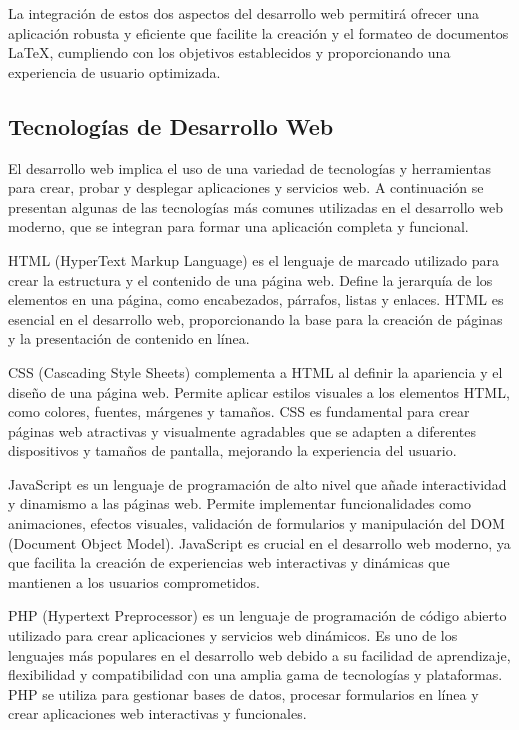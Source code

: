 La integración de estos dos aspectos del desarrollo web permitirá ofrecer una aplicación robusta y eficiente que facilite la creación y el formateo de documentos LaTeX, cumpliendo con los objetivos establecidos y proporcionando una experiencia de usuario optimizada.


\subsection{Tecnologías de Desarrollo Web}
El desarrollo web implica el uso de una variedad de tecnologías y herramientas para crear, probar y desplegar aplicaciones y servicios web. A continuación se presentan algunas de las tecnologías más comunes utilizadas en el desarrollo web moderno, que se integran para formar una aplicación completa y funcional.

HTML (HyperText Markup Language) es el lenguaje de marcado utilizado para crear la estructura y el contenido de una página web. Define la jerarquía de los elementos en una página, como encabezados, párrafos, listas y enlaces. HTML es esencial en el desarrollo web, proporcionando la base para la creación de páginas y la presentación de contenido en línea.

CSS (Cascading Style Sheets) complementa a HTML al definir la apariencia y el diseño de una página web. Permite aplicar estilos visuales a los elementos HTML, como colores, fuentes, márgenes y tamaños. CSS es fundamental para crear páginas web atractivas y visualmente agradables que se adapten a diferentes dispositivos y tamaños de pantalla, mejorando la experiencia del usuario.

JavaScript es un lenguaje de programación de alto nivel que añade interactividad y dinamismo a las páginas web. Permite implementar funcionalidades como animaciones, efectos visuales, validación de formularios y manipulación del DOM (Document Object Model). JavaScript es crucial en el desarrollo web moderno, ya que facilita la creación de experiencias web interactivas y dinámicas que mantienen a los usuarios comprometidos.

PHP (Hypertext Preprocessor) es un lenguaje de programación de código abierto utilizado para crear aplicaciones y servicios web dinámicos. Es uno de los lenguajes más populares en el desarrollo web debido a su facilidad de aprendizaje, flexibilidad y compatibilidad con una amplia gama de tecnologías y plataformas. PHP se utiliza para gestionar bases de datos, procesar formularios en línea y crear aplicaciones web interactivas y funcionales.

